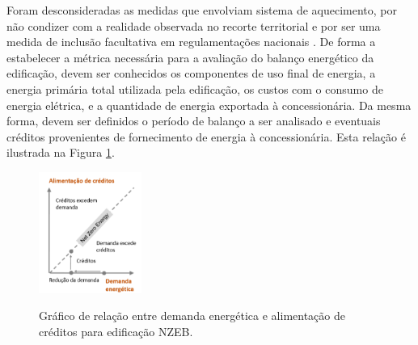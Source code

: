 \noindent Foram desconsideradas as medidas que envolviam sistema de aquecimento, por não condizer 
com a realidade observada no recorte territorial e por ser uma medida de inclusão facultativa 
em regulamentações nacionais \cite{InstitutoNacionaldeMetrologiaNormalizacaoeQualidadeIndustrial-INMETRO2018,InstitutoNacionaldeMetrologiaNormalizacaoeQualidadeIndustrial-INMETRO2018a}.
De forma a estabelecer a métrica necessária para a avaliação do balanço energético da edificação, 
devem ser conhecidos os componentes de uso final de energia, a energia primária total utilizada 
pela edificação, os custos com o consumo de energia elétrica, e a quantidade de energia 
exportada à concessionária. Da mesma forma, devem ser definidos o período de balanço a ser 
analisado e eventuais créditos provenientes de fornecimento de energia à concessionária. 
Esta relação é ilustrada na Figura \ref{Figura 2}.
\begin{figure}[h]
    \centering
    \caption{\small Gráfico de relação entre demanda energética e alimentação de créditos para edificação NZEB.}
    \includegraphics[width=0.3\textwidth]{figures/esquema_iea_2014-2.png}
    \label{Figura 2}
\end{figure}